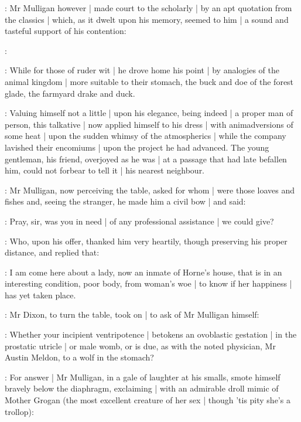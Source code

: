 :
Mr Mulligan however |
made court to the scholarly |
by an apt quotation from the classics |
which,
as it dwelt upon his memory,
seemed to him |
a sound and tasteful support of his contention:

\mulligan:

:
While for those of ruder wit |
he drove home his point |
by analogies of the animal kingdom |
more suitable to their stomach,
the buck and doe of the forest glade,
the farmyard drake and duck.


:
Valuing himself not a little |
upon his elegance,
being indeed |
a proper man of person,
this talkative |
now applied himself to his dress |
with animadversions of some heat |
upon the sudden whimsy of the atmospherics |
while the company lavished their encomiums |
upon the project he had advanced.
The young gentleman,
his friend,
overjoyed as he was |
at a passage that had late befallen him,
could not forbear to tell it |
his nearest neighbour.

:
Mr Mulligan,
now perceiving the table,
asked for whom |
were those loaves and fishes
and,
seeing the stranger,
he made him a civil bow |
and said:

\mulligan:
 Pray,
sir,
was you in need |
of any professional assistance |
we could give?

:
Who,
upon his offer,
thanked him very heartily,
though preserving his proper distance,
and replied that:

\Bloom:
I am come here about a lady,
now an inmate of Horne's house,
that is in an interesting condition,
poor body,
from woman's woe  |
to know if her happiness |
has yet taken place.

:
Mr Dixon,
to turn the table,
took on |
to ask of Mr Mulligan himself:

\dixon:
Whether your incipient ventripotence |
betokens an ovoblastic gestation |
in the prostatic utricle |
or male womb,
or is due,
as with the noted physician,
Mr Austin Meldon,
to a wolf in the stomach?%

:
For answer |
Mr Mulligan,
in a gale of laughter at his smalls,
smote himself bravely below the diaphragm,
exclaiming |
with an admirable droll mimic of Mother Grogan
(the most excellent creature of her sex |
though 'tis pity she's a trollop):

